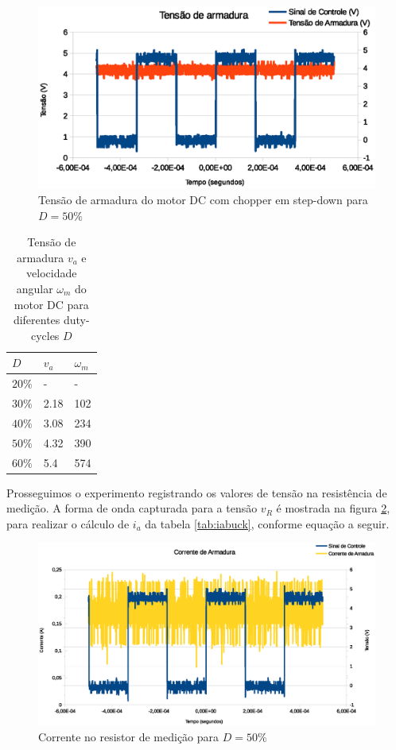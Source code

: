 \documentclass{article}
\begin{document}
\begin{figure}[H]
	\centering
	\includegraphics[width=\linewidth]{Dados/Buck/va}
	\caption{Tensão de armadura do motor DC com chopper em step-down para $D=50\%$}
	\label{fig:vabuck}
\end{figure}

\begin{table}[H]
	\centering
	\caption{Tensão de armadura $v_a$ e velocidade angular $\omega_m$ do motor DC para diferentes duty-cycles $D$}
	\label{tab:vabuck}
	\begin{tabular}{|l|l|l|}
		\hline
		$D$    & $v_a$ & $\omega_m$ \\ \hline
		$20\%$ & -     & -          \\ \hline
		$30\%$ & 2.18  & 102        \\ \hline
		$40\%$ & 3.08  & 234        \\ \hline
		$50\%$ & 4.32  & 390        \\ \hline
		$60\%$ & 5.4   & 574        \\ \hline
	\end{tabular}
\end{table}

Prosseguimos o experimento registrando os valores de tensão na resistência de medição. A forma de onda capturada para a tensão $v_R$ é mostrada na figura \ref{fig:iabuck}, para realizar o cálculo de $i_a$ da tabela \ref{tab:iabuck}, conforme equação a seguir.

\begin{figure}[H]
	\centering
	\includegraphics[width=\linewidth]{Dados/Buck/ia}
	\caption{Corrente no resistor de medição para $D=50\%$}
	\label{fig:iabuck}
\end{figure}
\end{document}
